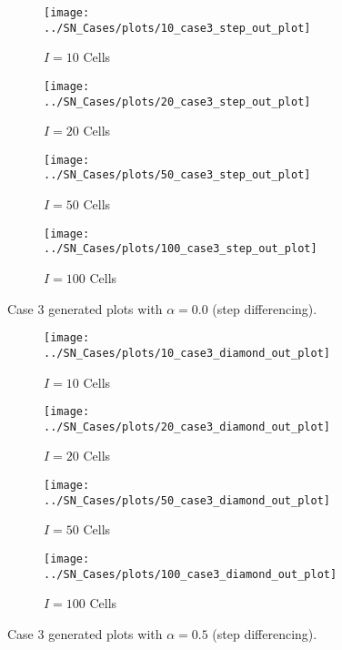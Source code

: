 \documentclass{NE515}
\theoremstyle{definition}
\begin{document}
    \begin{figure}
        \centering
        \begin{subfigure}{0.45\linewidth}
            \centering
            \texttt{[image: ../SN\_Cases/plots/10\_case3\_step\_out\_plot]}
            \caption{$I=10$ Cells}
        \end{subfigure}
        \hfill
        \begin{subfigure}{0.45\linewidth}
            \centering
            \texttt{[image: ../SN\_Cases/plots/20\_case3\_step\_out\_plot]}
            \caption{$I=20$ Cells}
        \end{subfigure}
        \hfill
        \begin{subfigure}{0.45\linewidth}
            \centering
            \texttt{[image: ../SN\_Cases/plots/50\_case3\_step\_out\_plot]}
            \caption{$I=50$ Cells}
        \end{subfigure}
        \hfill
        \begin{subfigure}{0.45\linewidth}
            \centering
            \texttt{[image: ../SN\_Cases/plots/100\_case3\_step\_out\_plot]}
            \caption{$I=100$ Cells}
        \end{subfigure}

        \caption{Case 3 generated plots with $\alpha = 0.0$ (step differencing).}
        \label{fig:case-3-step}
    \end{figure}


    \begin{figure}
        \centering
        \begin{subfigure}{0.45\linewidth}
            \centering
            \texttt{[image: ../SN\_Cases/plots/10\_case3\_diamond\_out\_plot]}
            \caption{$I=10$ Cells}
        \end{subfigure}
        \hfill
        \begin{subfigure}{0.45\linewidth}
            \centering
            \texttt{[image: ../SN\_Cases/plots/20\_case3\_diamond\_out\_plot]}
            \caption{$I=20$ Cells}
        \end{subfigure}
        \hfill
        \begin{subfigure}{0.45\linewidth}
            \centering
            \texttt{[image: ../SN\_Cases/plots/50\_case3\_diamond\_out\_plot]}
            \caption{$I=50$ Cells}
        \end{subfigure}
        \hfill
        \begin{subfigure}{0.45\linewidth}
            \centering
            \texttt{[image: ../SN\_Cases/plots/100\_case3\_diamond\_out\_plot]}
            \caption{$I=100$ Cells}
        \end{subfigure}

        \caption{Case 3 generated plots with $\alpha = 0.5$ (step differencing).}
        \label{fig:case-3-diamond}
    \end{figure}
\end{document}
